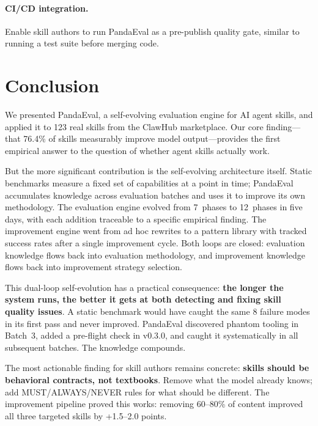 \documentclass[11pt,a4paper]{article}
\begin{document}
\paragraph{CI/CD integration.}
Enable skill authors to run PandaEval as a pre-publish quality gate, similar to running a test suite before merging code.

\section{Conclusion}
\label{sec:conclusion}

We presented PandaEval, a self-evolving evaluation engine for AI agent skills, and applied it to 123 real skills from the ClawHub marketplace. Our core finding---that 76.4\% of skills measurably improve model output---provides the first empirical answer to the question of whether agent skills actually work.

But the more significant contribution is the self-evolving architecture itself. Static benchmarks measure a fixed set of capabilities at a point in time; PandaEval accumulates knowledge across evaluation batches and uses it to improve its own methodology. The evaluation engine evolved from 7~phases to 12~phases in five days, with each addition traceable to a specific empirical finding. The improvement engine went from ad hoc rewrites to a pattern library with tracked success rates after a single improvement cycle. Both loops are closed: evaluation knowledge flows back into evaluation methodology, and improvement knowledge flows back into improvement strategy selection.

This dual-loop self-evolution has a practical consequence: \textbf{the longer the system runs, the better it gets at both detecting and fixing skill quality issues}. A static benchmark would have caught the same 8 failure modes in its first pass and never improved. PandaEval discovered phantom tooling in Batch~3, added a pre-flight check in v0.3.0, and caught it systematically in all subsequent batches. The knowledge compounds.

The most actionable finding for skill authors remains concrete: \textbf{skills should be behavioral contracts, not textbooks}. Remove what the model already knows; add MUST/ALWAYS/NEVER rules for what should be different. The improvement pipeline proved this works: removing 60--80\% of content improved all three targeted skills by +1.5--2.0 points.
\end{document}
